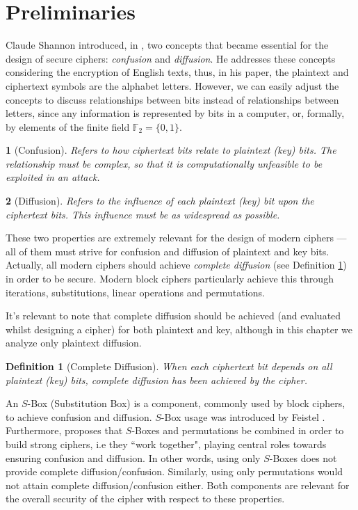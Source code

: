 \documentclass{report}
\newtheorem{definition}{Definition}{\bfseries}{\itshape}
\newtheorem*{concept}{}{\bfseries}{\itshape}
\begin{document}
\section{Preliminaries}\label{sec:preliminaries}
Claude Shannon introduced, in \cite{Shannon1949}, two concepts that became essential for the design of secure ciphers: \emph{confusion} and \emph{diffusion}. He addresses these concepts considering the encryption of English texts, thus, in his paper, the plaintext and ciphertext symbols are the alphabet letters. However, we can easily adjust the concepts to discuss relationships between bits instead of relationships between letters, since any information is represented by bits in a computer, or, formally, by elements of the finite field $\mathbb{F}_2 = \{0,1\}$.

\begin{concept}[Confusion]
Refers to how ciphertext bits relate to plaintext (key) bits. The relationship must be complex, so that it is computationally unfeasible to be exploited in an attack.
\end{concept}

\begin{concept}[Diffusion]
Refers to the influence of each plaintext (key) bit upon the ciphertext bits. This influence must be as widespread as possible.
\end{concept}

These two properties are extremely relevant for the design of modern ciphers --- all of them must strive for confusion and diffusion of plaintext and key bits. Actually, all modern ciphers should achieve \emph{complete diffusion} (see Definition \ref{def:complete-diffusion}) in order to be secure. Modern block ciphers particularly achieve this through iterations, substitutions, linear operations and permutations.

It's relevant to note that complete diffusion should be achieved (and evaluated whilst designing a cipher) for both plaintext and key, although in this chapter we analyze only plaintext diffusion.

\begin{definition}[Complete Diffusion]\label{def:complete-diffusion}
When each ciphertext bit depends on all plaintext (key) bits, complete diffusion has been achieved by the cipher.
\end{definition}

An $S$-Box (Substitution Box) is a component, commonly used by block ciphers, to achieve confusion and diffusion. $S$-Box usage was introduced by Feistel \cite{Feistel1973}. Furthermore, \cite{Feistel1973} proposes that $S$-Boxes and permutations be combined in order to build strong ciphers, i.e they ``work together", playing central roles towards ensuring confusion and diffusion. In other words, using only $S$-Boxes does not provide complete diffusion/confusion. Similarly, using only permutations would not attain complete diffusion/confusion either. Both components are relevant for the overall security of the cipher with respect to these properties.
\end{document}
